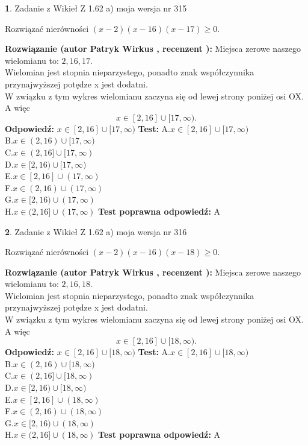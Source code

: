 \documentclass[12pt, a4paper]{article}
\theoremstyle{definition} %
\newtheorem{zad}{}
\newcommand{\zadStart}[1]{\begin{zad}#1\newline}
\newcommand{\zadStop}{\end{zad}}
\newcommand{\rozwStart}[2]{\noindent \textbf{Rozwiązanie (autor #1 , recenzent #2): }\newline}
\newcommand{\rozwStop}{\newline}
\newcommand{\odpStart}{\noindent \textbf{Odpowiedź:}\newline}
\newcommand{\odpStop}{\newline}
\newcommand{\testStart}{\noindent \textbf{Test:}\newline}
\newcommand{\testStop}{\newline}
\newcommand{\kluczStart}{\noindent \textbf{Test poprawna odpowiedź:}\newline}
\newcommand{\kluczStop}{\newline}
\begin{document}
\zadStart{Zadanie z Wikieł Z 1.62 a) moja wersja nr 315}

Rozwiązać nierówności $(x-2)(x-16)(x-17)\ge0$.
\zadStop
\rozwStart{Patryk Wirkus}{}
Miejsca zerowe naszego wielomianu to: $2, 16, 17$.\\
Wielomian jest stopnia nieparzystego, ponadto znak współczynnika przy\linebreak najwyższej potędze x jest dodatni.\\ W związku z tym wykres wielomianu zaczyna się od lewej strony poniżej osi OX. A więc $$x \in [2,16] \cup [17,\infty).$$
\rozwStop
\odpStart
$x \in [2,16] \cup [17,\infty)$
\odpStop
\testStart
A.$x \in [2,16] \cup [17,\infty)$\\
B.$x \in (2,16) \cup [17,\infty)$\\
C.$x \in (2,16] \cup [17,\infty)$\\
D.$x \in [2,16) \cup [17,\infty)$\\
E.$x \in [2,16] \cup (17,\infty)$\\
F.$x \in (2,16) \cup (17,\infty)$\\
G.$x \in [2,16) \cup (17,\infty)$\\
H.$x \in (2,16] \cup (17,\infty)$
\testStop
\kluczStart
A
\kluczStop



\zadStart{Zadanie z Wikieł Z 1.62 a) moja wersja nr 316}

Rozwiązać nierówności $(x-2)(x-16)(x-18)\ge0$.
\zadStop
\rozwStart{Patryk Wirkus}{}
Miejsca zerowe naszego wielomianu to: $2, 16, 18$.\\
Wielomian jest stopnia nieparzystego, ponadto znak współczynnika przy\linebreak najwyższej potędze x jest dodatni.\\ W związku z tym wykres wielomianu zaczyna się od lewej strony poniżej osi OX. A więc $$x \in [2,16] \cup [18,\infty).$$
\rozwStop
\odpStart
$x \in [2,16] \cup [18,\infty)$
\odpStop
\testStart
A.$x \in [2,16] \cup [18,\infty)$\\
B.$x \in (2,16) \cup [18,\infty)$\\
C.$x \in (2,16] \cup [18,\infty)$\\
D.$x \in [2,16) \cup [18,\infty)$\\
E.$x \in [2,16] \cup (18,\infty)$\\
F.$x \in (2,16) \cup (18,\infty)$\\
G.$x \in [2,16) \cup (18,\infty)$\\
H.$x \in (2,16] \cup (18,\infty)$
\testStop
\kluczStart
A
\kluczStop
\end{document}
